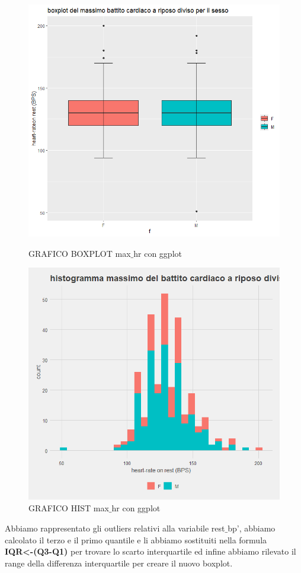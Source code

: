 \documentclass{article}
\begin{document}
\begin{figure}[!htb]
   \begin{minipage}{0.475\textwidth}
     \centering
     \includegraphics[width=1\linewidth]{rest_bp-boxplot before}
     \caption{GRAFICO BOXPLOT max$\_$hr con ggplot}
     \label{Fig:ds1}
   \end{minipage}\hfill
   \begin{minipage}{0.475\textwidth}
     \centering
     \includegraphics[width=1\linewidth]{rest_bp-hist before}
     \caption{GRAFICO HIST max$\_$hr con ggplot}
     \label{Fig:ds1}
   \end{minipage}
\end{figure}
\newpage
Abbiamo rappresentato gli outliers relativi alla variabile rest$\_$bp’, abbiamo calcolato il terzo e il primo quantile e li abbiamo sostituiti nella formula\\ \textbf{IQR\textless-(Q3-Q1)} per trovare lo scarto interquartile ed infine abbiamo rilevato il range della differenza interquartile per creare il nuovo boxplot. 
\end{document}
